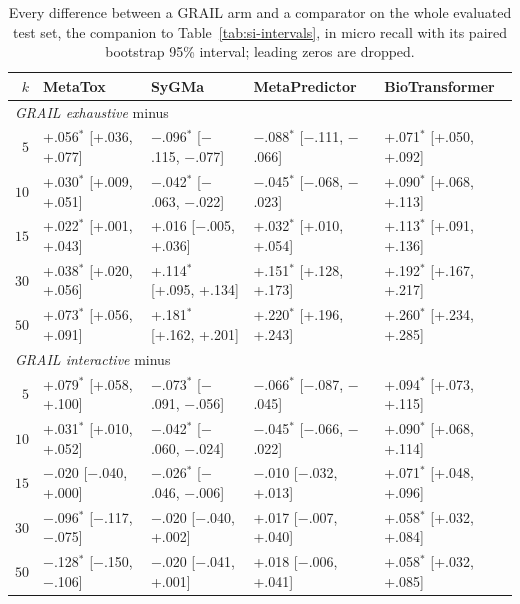 \begin{table}[h]
\centering\scriptsize
\begin{threeparttable}
\caption{Every difference between a GRAIL arm and a comparator on the whole evaluated test set, the companion to Table~\ref{tab:si-intervals}, in micro recall with its paired bootstrap 95\% interval; leading zeros are dropped.}
\label{tab:si-intervals-whole}
\setlength{\tabcolsep}{2.5pt}
\begin{tabular}{rllll}
\toprule
$k$ & MetaTox & SyGMa & MetaPredictor & BioTransformer \\
\midrule
\multicolumn{5}{l}{\emph{GRAIL exhaustive} minus} \\
$5$ & +.056$^{*}$ [+.036, +.077] & $-$.096$^{*}$ [$-$.115, $-$.077] & $-$.088$^{*}$ [$-$.111, $-$.066] & +.071$^{*}$ [+.050, +.092] \\
$10$ & +.030$^{*}$ [+.009, +.051] & $-$.042$^{*}$ [$-$.063, $-$.022] & $-$.045$^{*}$ [$-$.068, $-$.023] & +.090$^{*}$ [+.068, +.113] \\
$15$ & +.022$^{*}$ [+.001, +.043] & +.016\phantom{$^{*}$} [$-$.005, +.036] & +.032$^{*}$ [+.010, +.054] & +.113$^{*}$ [+.091, +.136] \\
$30$ & +.038$^{*}$ [+.020, +.056] & +.114$^{*}$ [+.095, +.134] & +.151$^{*}$ [+.128, +.173] & +.192$^{*}$ [+.167, +.217] \\
$50$ & +.073$^{*}$ [+.056, +.091] & +.181$^{*}$ [+.162, +.201] & +.220$^{*}$ [+.196, +.243] & +.260$^{*}$ [+.234, +.285] \\
\midrule
\multicolumn{5}{l}{\emph{GRAIL interactive} minus} \\
$5$ & +.079$^{*}$ [+.058, +.100] & $-$.073$^{*}$ [$-$.091, $-$.056] & $-$.066$^{*}$ [$-$.087, $-$.045] & +.094$^{*}$ [+.073, +.115] \\
$10$ & +.031$^{*}$ [+.010, +.052] & $-$.042$^{*}$ [$-$.060, $-$.024] & $-$.045$^{*}$ [$-$.066, $-$.022] & +.090$^{*}$ [+.068, +.114] \\
$15$ & $-$.020\phantom{$^{*}$} [$-$.040, +.000] & $-$.026$^{*}$ [$-$.046, $-$.006] & $-$.010\phantom{$^{*}$} [$-$.032, +.013] & +.071$^{*}$ [+.048, +.096] \\
$30$ & $-$.096$^{*}$ [$-$.117, $-$.075] & $-$.020\phantom{$^{*}$} [$-$.040, +.002] & +.017\phantom{$^{*}$} [$-$.007, +.040] & +.058$^{*}$ [+.032, +.084] \\
$50$ & $-$.128$^{*}$ [$-$.150, $-$.106] & $-$.020\phantom{$^{*}$} [$-$.041, +.001] & +.018\phantom{$^{*}$} [$-$.006, +.041] & +.058$^{*}$ [+.032, +.085] \\
\bottomrule
\end{tabular}


\end{threeparttable}
\end{table}
